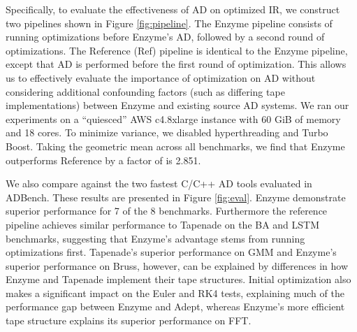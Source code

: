 Specifically, to evaluate the effectiveness of AD on optimized IR, we construct two pipelines shown in Figure \ref{fig:pipeline}. The Enzyme pipeline consists of running optimizations before Enzyme's AD, followed by a second round of optimizations. The Reference (Ref) pipeline is identical to the Enzyme pipeline, except that AD is performed before the first round of optimization. This allows us to effectively evaluate the importance of optimization on AD without considering additional confounding factors (such as differing tape implementations) between Enzyme and existing source AD systems. We ran our experiments on a ``quiesced'' AWS c4.8xlarge instance with 60 GiB of memory and 18 cores. To minimize variance, we disabled hyperthreading and Turbo Boost. Taking the geometric mean across all benchmarks, we find that Enzyme outperforms Reference by a factor of is 2.851.

We also compare against the two fastest C/C++ AD tools evaluated in ADBench. These results are presented in Figure \ref{fig:eval}. Enzyme demonstrate superior performance for 7 of the 8 benchmarks. Furthermore the reference pipeline achieves similar performance to Tapenade on the BA and LSTM benchmarks, suggesting that Enzyme's advantage stems from running optimizations first. Tapenade's superior performance on GMM and Enzyme's superior performance on Bruss, however, can be explained by differences in how Enzyme and Tapenade implement their tape structures. Initial optimization also makes a significant impact on the Euler and RK4 tests, explaining much of the performance gap between Enzyme and Adept, whereas Enzyme's more efficient tape structure explains its superior performance on FFT.